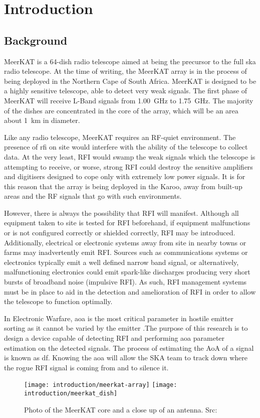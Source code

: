 \chapter{Introduction}
\label{ch:introduction}
\section{Background}
MeerKAT is a 64-dish radio telescope aimed at being the precursor to the full \gls{ska} radio telescope. At the time of writing, the MeerKAT array is in the process of being deployed in the Northern Cape of South Africa.
MeerKAT is designed to be a highly sensitive telescope, able to detect very weak signals. The first phase of MeerKAT will receive L-Band signals from \SI{1.00}{\giga\hertz} to \SI{1.75}{\giga\hertz}. The majority of the dishes are concentrated in the core of the array, which will be an area about \SI{1}{\kilo\meter} in diameter.

Like any radio telescope, MeerKAT requires an RF-quiet environment.
The presence of \gls{rfi} on site would interfere with the ability of the telescope to collect data. At the very least, RFI would swamp the weak signals which the telescope is attempting to receive, or  worse, strong RFI could destroy the sensitive amplifiers and digitisers designed to cope only with extremely low power signals.
It is for this reason that the array is being deployed in the Karoo, away from built-up areas and the RF signals that go with such environments.

However, there is always the possibility that RFI will manifest. 
Although all equipment taken to site is tested for RFI beforehand, if equipment malfunctions or is not configured correctly or shielded correctly, RFI may be introduced. Additionally, electrical or electronic systems away from site in nearby towns or farms may inadvertently emit RFI. 
Sources such as communications systems or electronics typically emit a well defined narrow band signal, or alternatively, malfunctioning electronics could emit spark-like discharges producing very short bursts of broadband noise (impulsive RFI).
As such, RFI management systems must be in place to aid in the detection and amelioration of RFI in order to allow the telescope to function optimally. 

In Electronic Warfare, \gls{aoa} is the most critical parameter in hostile emitter sorting as it cannot be varied by the emitter \cite{center2012electronic}.The purpose of this research is to design a device capable of detecting RFI and performing \gls{aoa} parameter estimation on the detected signals.
The process of estimating the AoA of a signal is known as \gls{df}.
Knowing the \gls{aoa} will allow the SKA team to track down where the rogue RFI signal is coming from and to silence it.

\begin{figure}[hb]
  \centering
  \texttt{[image: introduction/meerkat-array]}
  \texttt{[image: introduction/meerkat\_dish]}
  \caption{Photo of the MeerKAT core and a close up of an antenna. Src: \cite{skasawebsite}}
\end{figure}



